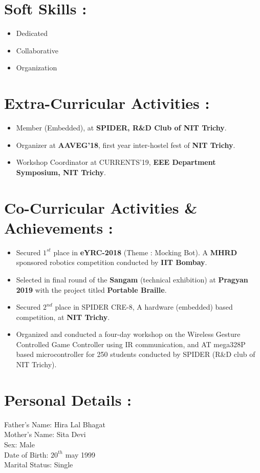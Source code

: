 \documentclass[a4paper, 12 pt]{article}
\begin{document}
\section*{Soft Skills :}
\begin{itemize}
\item Dedicated
\item Collaborative
\item Organization
\end{itemize}
\section*{Extra-Curricular Activities :}
\begin{itemize}
\item Member (Embedded), at {\bf SPIDER, R\&D Club of NIT Trichy}.
\item Organizer at {\bf AAVEG’18}, first year inter-hostel fest of {\bf NIT Trichy}.
\item Workshop Coordinator at CURRENTS’19, {\bf EEE Department Symposium, NIT Trichy}.
\end{itemize}
\section*{Co-Curricular Activities \& Achievements :}
\begin{itemize}
\item Secured $1^{st}$ place in {\bf  eYRC-2018} (Theme : Mocking Bot). A {\bf MHRD} sponsored robotics competition conducted by {\bf IIT Bombay}.
\item Selected in final round of the {\bf Sangam} (technical exhibition) at {\bf Pragyan 2019} with the project titled {\bf Portable Braille}.
\item Secured $2^{nd}$ place in SPIDER CRE-8, A hardware (embedded) based competition, at {\bf NIT Trichy}.
\item Organized and conducted a four-day workshop on the Wireless Gesture Controlled Game Controller using IR communication, and AT mega328P based microcontroller for 250 students conducted by SPIDER (R\&D club of NIT Trichy).
\end{itemize}
\section*{Personal Details :}
\hspace{1cm}Father's Name: Hira Lal Bhagat\\
\hspace{1cm}Mother's Name: Sita Devi\\
\hspace{1cm}Sex: Male\\
\hspace{1cm}Date of Birth: $20^{th}$ may 1999\\
\hspace{1cm}Marital Status: Single
\end{document}
